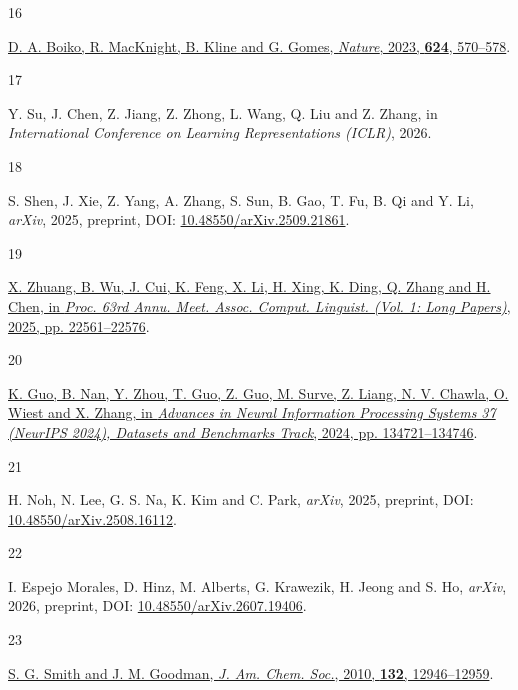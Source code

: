 \documentclass[
  10pt,
]{article}
\newlength{\cslhangindent}
\newlength{\csllabelwidth}
\newlength{\cslentryspacingunit} %
\newenvironment{CSLReferences}[2] %
 {%
  \setlength{\parindent}{0pt}
  \ifodd #1
  \let\oldpar\par
  \def\par{\hangindent=\cslhangindent\oldpar}
  \fi
  \setlength{\parskip}{#2\cslentryspacingunit}
 }%
 {}
\newcommand{\CSLLeftMargin}[1]{\parbox[t]{\csllabelwidth}{#1}}
\newcommand{\CSLRightInline}[1]{\parbox[t]{\linewidth - \csllabelwidth}{#1}\break}
\begin{document}
\begin{CSLReferences}{0}{0}
\leavevmode{}%
\CSLLeftMargin{16 }%
\CSLRightInline{\href{https://doi.org/10.1038/s41586-023-06792-0}{D. A.
Boiko, R. MacKnight, B. Kline and G. Gomes, \emph{Nature}, 2023,
\textbf{624}, 570--578}.}

\leavevmode{}%
\CSLLeftMargin{17 }%
\CSLRightInline{Y. Su, J. Chen, Z. Jiang, Z. Zhong, L. Wang, Q. Liu and
Z. Zhang, in \emph{International Conference on Learning Representations
(ICLR)}, 2026.}

\leavevmode{}%
\CSLLeftMargin{18 }%
\CSLRightInline{S. Shen, J. Xie, Z. Yang, A. Zhang, S. Sun, B. Gao, T.
Fu, B. Qi and Y. Li, \emph{arXiv}, 2025, preprint, DOI:
\href{https://doi.org/10.48550/arXiv.2509.21861}{10.48550/arXiv.2509.21861}.}

\leavevmode{}%
\CSLLeftMargin{19 }%
\CSLRightInline{\href{https://doi.org/10.18653/v1/2025.acl-long.1100}{X.
Zhuang, B. Wu, J. Cui, K. Feng, X. Li, H. Xing, K. Ding, Q. Zhang and H.
Chen, in \emph{Proc. 63rd Annu. Meet. Assoc. Comput. Linguist. (Vol. 1:
Long Papers)}, 2025, pp. 22561--22576}.}

\leavevmode{}%
\CSLLeftMargin{20 }%
\CSLRightInline{\href{https://doi.org/10.52202/079017-4281}{K. Guo, B.
Nan, Y. Zhou, T. Guo, Z. Guo, M. Surve, Z. Liang, N. V. Chawla, O. Wiest
and X. Zhang, in \emph{Advances in Neural Information Processing Systems
37 (NeurIPS 2024), Datasets and Benchmarks Track}, 2024, pp.
134721--134746}.}

\leavevmode{}%
\CSLLeftMargin{21 }%
\CSLRightInline{H. Noh, N. Lee, G. S. Na, K. Kim and C. Park,
\emph{arXiv}, 2025, preprint, DOI:
\href{https://doi.org/10.48550/arXiv.2508.16112}{10.48550/arXiv.2508.16112}.}

\leavevmode{}%
\CSLLeftMargin{22 }%
\CSLRightInline{I. Espejo Morales, D. Hinz, M. Alberts, G. Krawezik, H.
Jeong and S. Ho, \emph{arXiv}, 2026, preprint, DOI:
\href{https://doi.org/10.48550/arXiv.2607.19406}{10.48550/arXiv.2607.19406}.}

\leavevmode{}%
\CSLLeftMargin{23 }%
\CSLRightInline{\href{https://doi.org/10.1021/ja105035r}{S. G. Smith and
J. M. Goodman, \emph{J. Am. Chem. Soc.}, 2010, \textbf{132},
12946--12959}.}


\end{CSLReferences}
\end{document}
